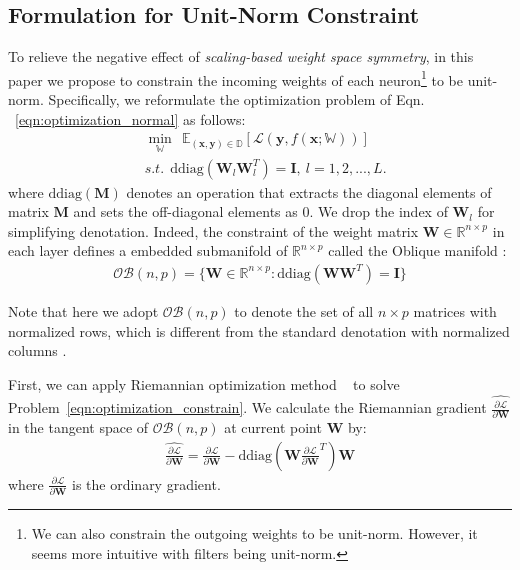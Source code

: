 \documentclass[twocolumn]{article}
\begin{document}
\subsection{Formulation for Unit-Norm Constraint}
To relieve the negative effect of \emph{scaling-based weight space symmetry}, in this paper we propose to constrain the incoming weights of each neuron\footnote{We  can  also constrain the outgoing weights to be unit-norm. However, it seems more intuitive with filters being unit-norm.} to be unit-norm. Specifically, we reformulate the optimization problem of Eqn. ~\ref{eqn:optimization_normal} as follows:
 \begin{eqnarray}
\label{eqn:optimization_constrain}
& \min_{\mathbb{W}} ~~\mathbb{E}_{(\mathbf{x},\mathbf{y})\in \mathbb{D}} [\mathcal{L}(\mathbf{y}, f(\mathbf{x}; \mathbb{W}))]  \nonumber \\
& s.t.~~  \text{ddiag}(\mathbf{W}_l \mathbf{W}_l^T)=\mathbf{I}, ~l=1,2,...,L.
\end{eqnarray}
where $\text{ddiag}(\mathbf{M})$ denotes an operation that extracts the diagonal elements of matrix $\mathbf{M}$ and sets the off-diagonal elements as 0. We drop the index of $\mathbf{W}_l$ for simplifying denotation. Indeed, the constraint of the weight matrix $\mathbf{W} \in \mathbb{R}^{n \times p}$ in each layer defines a embedded submanifold of $\mathbb{R}^{n \times p}$ called the Oblique manifold \cite{2006_ICASSP_Absil}:
 \begin{eqnarray}
\mathcal{OB}(n,p)=\{\mathbf{W} \in \mathbb{R}^{n \times p}: \text{ddiag}(\mathbf{W} \mathbf{W}^T)=\mathbf{I}   \}
\end{eqnarray}

Note that here we adopt $\mathcal{OB}(n,p)$ to denote the set of all $n \times p$ matrices with normalized rows, which is  different from the standard denotation with normalized columns \cite{2006_ICASSP_Absil,2008_Book_Absil}.


First, we can apply Riemannian optimization method ~\cite{2008_Book_Absil} to solve Problem~\ref{eqn:optimization_constrain}. We  calculate the Riemannian gradient $\widehat{\frac{\partial \mathcal{L} }{\partial \mathbf{W}}}$ in the tangent space of $\mathcal{OB}(n,p)$ at current point $\mathbf{W}$ by:
 \begin{eqnarray}
 \label{eqn:gradient_Reim}
\widehat{\frac{\partial \mathcal{L} }{\partial \mathbf{W}}}=\frac{\partial \mathcal{L} }{\partial \mathbf{W}} - \text{ddiag}(\mathbf{W} \frac{\partial \mathcal{L} }{\partial \mathbf{W}}^T) \mathbf{W}
\end{eqnarray}
where $\frac{\partial \mathcal{L} }{\partial \mathbf{W}}$ is the ordinary gradient.
\end{document}
